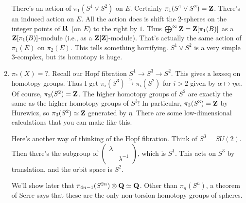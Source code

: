 \begin{enumerate}
	There's an action of $\pi_1(S^1\vee S^2)$ on $E$. Certainly $\pi_1(S^1\vee S^2) = \mathbf Z$. There's an induced action on $E$. All the action does is shift the $2$-spheres on the integer points of $\mathbf R$ (on $E$) to the right by $1$. Thus $\bigoplus^\infty\mathbf Z=\mathbf Z[\pi_1(B)]$ as a $\mathbf Z[\pi_1(B)]$-module (i.e., as a $\mathbf Z[\mathbf Z]$-module). That's actually the same action of $\pi_1(E)$ on $\pi_2(E)$.	This tells something horrifying. $S^1\vee S^2$ is a very simple $3$-complex, but its homotopy is huge.
    \item $\pi_\ast(X)=?$. Recall our Hopf fibration $S^1\to S^3\to S^2$. This gives a lexseq on homotopy groups. Thus I get $\pi_i(S^3)\xrightarrow{\simeq}\pi_i(S^2)$ for $i>2$ given by $\alpha\mapsto\eta\alpha$. Of course, $\pi_2(S^2) = \mathbf Z$. The higher homotopy groups of $S^2$ are exactly the same as the higher homotopy groups of $S^3$! In particular, $\pi_3(S^3)=\mathbf Z$ by Hurewicz, so $\pi_3(S^2)\simeq \mathbf Z$ generated by $\eta$. There are some low-dimensional calculations that you can make like this.

	Here's another way of thinking of the Hopf fibration. Think of $S^3 = SU(2)$. Then there's the subgroup of $\begin{pmatrix}\lambda & \\ & \lambda^{-1}\end{pmatrix}$, which is $S^1$. This acts on $S^3$ by translation, and the orbit space is $S^2$.

	We'll show later that $\pi_{4n-1}(S^{2n})\otimes\mathbf Q\simeq \mathbf Q$. Other than $\pi_n(S^n)$, a theorem of Serre says that these are the only non-torsion homotopy groups of spheres.
\end{enumerate}
